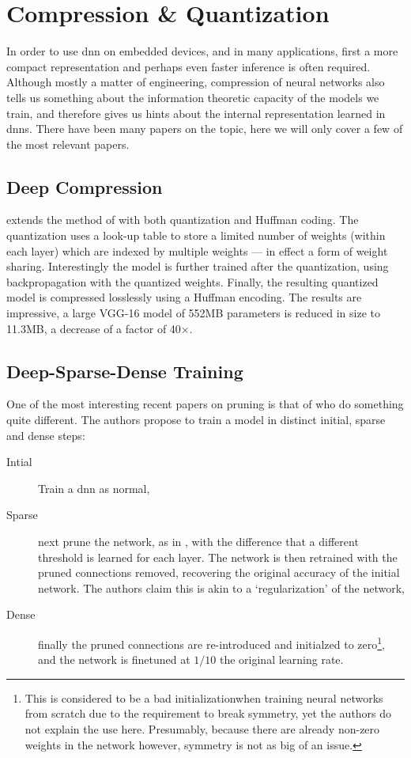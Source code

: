 \documentclass[thesis]{subfiles}
\begin{document}
	\section{Compression \& Quantization}
	In order to use \gls{dnn} on embedded devices, and in many applications, first a more compact representation and perhaps even faster inference is often required. Although mostly a matter of engineering, compression of neural networks also tells us something about the information theoretic capacity of the models we train, and therefore gives us hints about the internal representation learned in \glspl{dnn}. There have been many papers on the topic, here we will only cover a few of the most relevant papers.

	\subsection{Deep Compression}
	\citet{han2015deep} extends the method of \citet{han2015learning} with both quantization and Huffman coding. The quantization uses a look-up table to store a limited number of weights (within each layer) which are indexed by multiple weights --- in effect a form of weight sharing. Interestingly the model is further trained after the quantization, using backpropagation with the quantized weights. Finally, the resulting quantized model is compressed losslessly using a Huffman encoding. The results are impressive, a large VGG-16 model of 552MB parameters is reduced in size to 11.3MB, a decrease of a factor of 40$\times$.

	\subsection{Deep-Sparse-Dense Training}
	One of the most interesting recent papers on pruning is that of \citet{han2016dsd} who do something quite different. The authors propose to train a model in distinct initial, sparse and dense steps:
	\begin{description}
		\item[Intial] Train a \gls{dnn} as normal,
		\item[Sparse] next prune the network, as in \citet{han2015learning}, with the difference that a different threshold is learned for each layer. The network is then retrained with the pruned connections removed, recovering the original accuracy of the initial network. The authors claim this is akin to a `regularization' of the network,
		\item[Dense] finally the pruned connections are re-introduced and initialzed to zero\footnote{This is considered to be a bad initializationwhen training neural networks from scratch due to the requirement to break symmetry, yet the authors do not explain the use here. Presumably, because there are already non-zero weights in the network however, symmetry is not as big of an issue.}, and the network is \gls{finetuned} at $1/10$ the original learning rate.
	\end{description}
\end{document}
